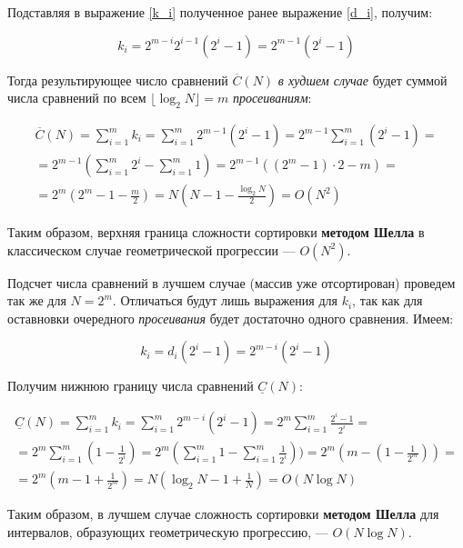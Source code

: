 \documentclass[a4paper,12pt,titlepage,finall]{article}
\begin{document}
Подставляя в выражение \eqref{k_i} полученное ранее выражение \eqref{d_i}, получим:

$$k_i = 2^{m-i} 2^{i-1} (2^i - 1) = 2^{m-1} (2^i - 1)$$

Тогда результирующее число сравнений $\overline{C} (N)$ \textit{в худшем случае} будет суммой числа сравнений по всем $\lfloor \log_{2}{N} \rfloor = m$ \textit{просеиваниям}:

\begin{eqnarray*}
\overline{C} (N) = \displaystyle\sum_{i=1}^{m}k_i = \displaystyle\sum_{i=1}^{m} 2^{m-1} (2^i - 1) = 2^{m-1} \displaystyle\sum_{i=1}^{m} (2^i - 1) = \\
= 2^{m-1} (\displaystyle\sum_{i=1}^{m} 2^i   - \displaystyle\sum_{i=1}^{m}1) = 2^{m-1} ((2^m-1) \cdot2 - m) =\\
= 2^m (2^m-1 - \frac{m}{2}) = N (N - 1 - \frac{\log_{2}{N}}{2}) = O(N^2)
\end{eqnarray*}

Таким образом, верхняя граница сложности сортировки \textbf{методом Шелла} в классическом случае геометрической прогрессии — $O(N^2)$. 

\par

Подсчет числа сравнений в лучшем случае (массив уже отсортирован) проведем так же для $N = 2 ^ m$. Отличаться будут лишь выражения для  $k_i$, так как для оставновки очередного \textit{просеивания} будет достаточно одного сравнения. Имеем:

\begin{equation}\label{k_i_best}
k_i = d_i (2^i - 1) = 2^{m-i}(2^i - 1)
\end{equation}

Получим нижнюю границу числа сравнений $\underline{C} (N)$:

\begin{eqnarray*}
\underline{C} (N) = \displaystyle\sum_{i=1}^{m}k_i = \displaystyle\sum_{i=1}^{m}  2^{m-i}(2^i - 1) = 2^m  \displaystyle\sum_{i=1}^{m} \frac{2^i - 1}{2^i} = \\
=  2^m  \displaystyle\sum_{i=1}^{m} (1 - \frac{1}{2^i}) =  2^m ( \displaystyle\sum_{i=1}^{m} 1 -\displaystyle\sum_{i=1}^{m} \frac{1}{2^i}) ) = 2^m ( m - (1 - \frac{1}{2^m}) ) = \\
= 2^m ( m - 1 + \frac{1}{2^m} ) = N (\log_{2}{N} - 1 + \frac{1}{N}) = O(N \log{N})
\end{eqnarray*}

Таким образом, в лучшем случае сложность сортировки \textbf{методом Шелла} для интервалов, образующих геометрическую прогрессию, — $O(N \log{N})$. 
\end{document}
